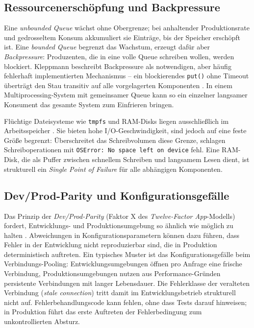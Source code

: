 \subsection{Ressourcenerschöpfung und Backpressure}
\label{sec:grundlagen-ressourcen}

Eine \textit{unbounded Queue} wächst ohne Obergrenze; bei anhaltender Produktionsrate und
gedrosseltem Konsum akkumuliert sie Einträge, bis der Speicher erschöpft ist. Eine
\textit{bounded Queue} begrenzt das Wachstum, erzeugt dafür aber \textit{Backpressure}:
Produzenten, die in eine volle Queue schreiben wollen, werden blockiert. Kleppmann
beschreibt Backpressure als notwendigen, aber häufig fehlerhaft implementierten
Mechanismus -- ein blockierendes \texttt{put()} ohne Timeout überträgt den Stau transitiv
auf alle vorgelagerten Komponenten \cite{kleppmann2017}. In einem Multiprocessing-System
mit gemeinsamer Queue kann so ein einzelner langsamer Konsument das gesamte System zum
Einfrieren bringen.

Flüchtige Dateisysteme wie \texttt{tmpfs} und RAM-Disks liegen ausschließlich im
Arbeitsspeicher \cite{linux_tmpfs}. Sie bieten hohe I/O-Geschwindigkeit, sind jedoch auf
eine feste Größe begrenzt: Überschreitet das Schreibvolumen diese Grenze, schlagen
Schreiboperationen mit \texttt{OSError: No space left on device} fehl. Eine RAM-Disk, die
als Puffer zwischen schnellem Schreiben und langsamem Lesen dient, ist strukturell ein
\textit{Single Point of Failure} für alle abhängigen Komponenten.

\subsection{Dev/Prod-Parity und Konfigurationsgefälle}
\label{sec:grundlagen-parity}

Das Prinzip der \textit{Dev/Prod-Parity} (Faktor X des \textit{Twelve-Factor App}-Modells)
fordert, Entwicklungs- und Produktionsumgebung so ähnlich wie möglich zu halten
\cite{wiggins2011}. Abweichungen in Konfigurationsparametern können dazu führen, dass
Fehler in der Entwicklung nicht reproduzierbar sind, die in Produktion deterministisch
auftreten. Ein typisches Muster ist das Konfigurationsgefälle beim Verbindungs-Pooling:
Entwicklungsumgebungen öffnen pro Anfrage eine frische Verbindung, Produktionsumgebungen
nutzen aus Performance-Gründen persistente Verbindungen mit langer Lebensdauer. Die
Fehlerklasse der veralteten Verbindung (\textit{stale connection}) tritt damit im
Entwicklungsbetrieb strukturell nicht auf. Fehlerbehandlungscode kann fehlen, ohne dass
Tests darauf hinweisen; in Produktion führt das erste Auftreten der Fehlerbedingung zum
unkontrollierten Absturz.
